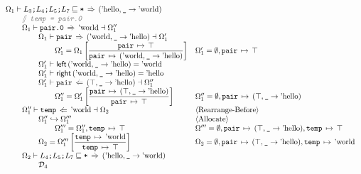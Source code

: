 \documentclass[12pt,twoside]{report}
\begin{document}
{\[\begin{array}{ll}
  \Omega_1 \vdash L_3\mono{;}L_4\mono{;}L_5\mono{;}L_7 \subtype \mono{*} \movearrowabs (\atom{hello}, \mono{\_} \rightarrow \atom{world}) \\
  \otab \ocomment{\mono{temp = pair.0}} \\
  \otab \Omega_1 \vdash \mono{pair.0} \movearrowabs \atom{world} \dashv \Omega_1'' \\
  \otab \otab \Omega_1 \vdash \mono{pair} \movearrowabs (\atom{world}, \mono{\_} \rightarrow \atom{hello}) \dashv \Omega_1' \\
  \otab\otab\otab \Omega_1' = \Omega_1\left[\dfrac{\absmapm{pair}{\top}}{\absmapm{pair}{(\atom{world}, \mono{\_} \rightarrow \atom{hello})}}\right] &
    \Omega_1' = \emptyset, \absmapm{pair}{\top} \\
  \otab \otab \Omega_1' \vdash \oleft{(\atom{world}, \mono{\_} \rightarrow \atom{hello})} = \atom{world} \\
  \otab \otab \Omega_1' \vdash \oright{(\atom{world}, \mono{\_} \rightarrow \atom{hello})} = \atom{hello} \\
  \otab \otab \Omega_1' \vdash \mono{pair} \writearrowabs (\top, \mono{\_} \rightarrow \atom{hello}) \dashv \Omega_1'' \\
  \otab\otab\otab \Omega_1'' = \Omega_1'\left[\dfrac{\absmapm{pair}{(\top, \mono{\_} \rightarrow \atom{hello})}}{\absmapm{pair}{\top}}\right] &
    \Omega_1'' = \emptyset,\absmapm{pair}{(\top, \mono{\_} \rightarrow \atom{hello})} \\
  \otab\Omega_1'' \vdash \mono{temp} \writearrowabs \atom{world} \dashv \Omega_2 &
    \langle\text{Rearrange-Before}\rangle \\
  \otab\otab \Omega_1'' \rearrangearrow \Omega_1''' &
    \langle\text{Allocate}\rangle \\
  \otab\otab\otab \Omega_1''' = \Omega_1'', \absmapm{temp}{\top} &
    \Omega''' = \emptyset,\absmapm{pair}{(\top, \mono{\_} \rightarrow \atom{hello})}, \absmapm{temp}{\top} \\
  \otab\otab \Omega_2 = \Omega_1'''\left[\dfrac{\absmapm{temp}{\atom{world}}}{\absmapm{temp}{\top}}\right] &
    \Omega_2 = \emptyset,\absmapm{pair}{(\top, \mono{\_} \rightarrow \atom{hello})}, \absmapm{temp}{\atom{world}} \\
  \otab \Omega_2 \vdash L_4\mono{;}L_5\mono{;}L_7 \subtype \mono{*} \movearrowabs (\atom{hello}, \mono{\_} \rightarrow \atom{world}) \\
  \otab\otab \mathcal{D}_4 \\


\end{array}\]}
\end{document}
